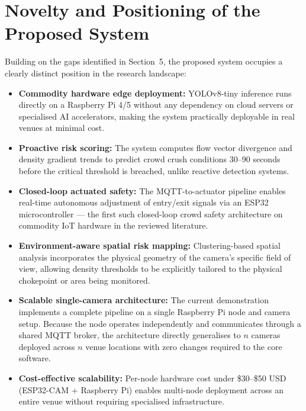 \documentclass[12pt,a4paper]{article}
\begin{document}
\section{Novelty and Positioning of the Proposed System}

Building on the gaps identified in Section~5, the proposed system occupies a clearly distinct position in the research landscape:

\begin{itemize}[leftmargin=1.5em, itemsep=4pt]
  \item \textbf{Commodity hardware edge deployment:} YOLOv8-tiny inference runs directly on a Raspberry Pi 4/5 without any dependency on cloud servers or specialised AI accelerators, making the system practically deployable in real venues at minimal cost.
  \item \textbf{Proactive risk scoring:} The system computes flow vector divergence and density gradient trends to predict crowd crush conditions 30--90 seconds before the critical threshold is breached, unlike reactive detection systems.
  \item \textbf{Closed-loop actuated safety:} The MQTT-to-actuator pipeline enables real-time autonomous adjustment of entry/exit signals via an ESP32 microcontroller — the first such closed-loop crowd safety architecture on commodity IoT hardware in the reviewed literature.
  \item \textbf{Environment-aware spatial risk mapping:} Clustering-based spatial analysis incorporates the physical geometry of the camera's specific field of view, allowing density thresholds to be explicitly tailored to the physical chokepoint or area being monitored.
  \item \textbf{Scalable single-camera architecture:} The current demonstration implements a complete pipeline on a single Raspberry Pi node and camera setup. Because the node operates independently and communicates through a shared MQTT broker, the architecture directly generalises to $n$ cameras deployed across $n$ venue locations with zero changes required to the core software.
  \item \textbf{Cost-effective scalability:} Per-node hardware cost under \$30--\$50 USD (ESP32-CAM + Raspberry Pi) enables multi-node deployment across an entire venue without requiring specialised infrastructure.
\end{itemize}

\end{document}
